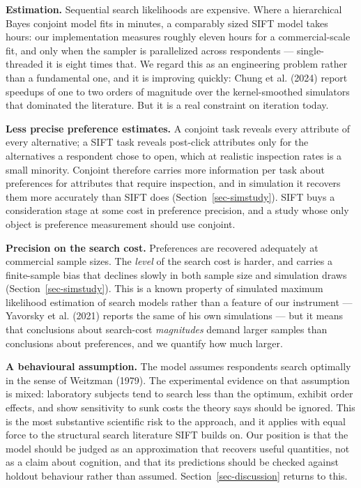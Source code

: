 \documentclass[
  letterpaper,
  DIV=11,
  numbers=noendperiod]{scrartcl}
\begin{document}
\textbf{Estimation.} Sequential search likelihoods are expensive. Where
a hierarchical Bayes conjoint model fits in minutes, a comparably sized
SIFT model takes hours: our implementation measures roughly eleven hours
for a commercial-scale fit, and only when the sampler is parallelized
across respondents --- single-threaded it is eight times that. We regard
this as an engineering problem rather than a fundamental one, and it is
improving quickly: Chung et al. (2024) report speedups of one to two
orders of magnitude over the kernel-smoothed simulators that dominated
the literature. But it is a real constraint on iteration today.

\textbf{Less precise preference estimates.} A conjoint task reveals
every attribute of every alternative; a SIFT task reveals post-click
attributes only for the alternatives a respondent chose to open, which
at realistic inspection rates is a small minority. Conjoint therefore
carries more information per task about preferences for attributes that
require inspection, and in simulation it recovers them more accurately
than SIFT does (Section~\ref{sec-simstudy}). SIFT buys a consideration
stage at some cost in preference precision, and a study whose only
object is preference measurement should use conjoint.

\textbf{Precision on the search cost.} Preferences are recovered
adequately at commercial sample sizes. The \emph{level} of the search
cost is harder, and carries a finite-sample bias that declines slowly in
both sample size and simulation draws (Section~\ref{sec-simstudy}). This
is a known property of simulated maximum likelihood estimation of search
models rather than a feature of our instrument --- Yavorsky et al.
(2021) reports the same of his own simulations --- but it means that
conclusions about search-cost \emph{magnitudes} demand larger samples
than conclusions about preferences, and we quantify how much larger.

\textbf{A behavioural assumption.} The model assumes respondents search
optimally in the sense of Weitzman (1979). The experimental evidence on
that assumption is mixed: laboratory subjects tend to search less than
the optimum, exhibit order effects, and show sensitivity to sunk costs
the theory says should be ignored. This is the most substantive
scientific risk to the approach, and it applies with equal force to the
structural search literature SIFT builds on. Our position is that the
model should be judged as an approximation that recovers useful
quantities, not as a claim about cognition, and that its predictions
should be checked against holdout behaviour rather than assumed.
Section~\ref{sec-discussion} returns to this.
\end{document}
